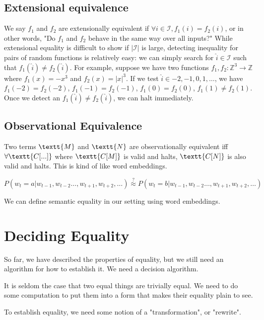 \documentclass[11pt]{article}
\begin{document}
    \subsection{Extensional equivalence}\label{subsec:extensional-equivalence}

    We say $f_1$ and $f_2$ are extensionally equivalent if $\forall i \in \mathcal{I}, f_1(i)=f_2(i)$, or in other words, "Do $f_1$ and $f_2$ behave in the same way over all inputs?" While extensional equality is difficult to show if $|\mathcal{I}|$ is large, detecting inequality for pairs of random functions is relatively easy: we can simply search for $\hat i \in \mathcal{I}$ such that $f_1(\hat i) \neq f_2(\hat i)$. For example, suppose we have two functions $f_1, f_2: \mathbb{Z}^3 \rightarrow \mathbb{Z}$ where $f_1(x)=-x^3$ and $f_2(x)=|x|^3$. If we test $\hat i \in {-2, -1, 0, 1, \ldots}$, we have $f_1(-2)=f_2(-2)$, $f_1(-1)=f_2(-1)$, $f_1(0)=f_2(0)$, $f_1(1) \neq f_2(1)$. Once we detect an $f_1(\hat i) \neq f_2(\hat i)$, we can halt immediately.

    \subsection{Observational Equivalence}

    Two terms $\textt{M}$ and $\textt{N}$ are observationally equivalent iff $\forall \textt{C[...]}$ where $\textt{C[M]}$ is valid and halts, $\textt{C[N]}$ is also valid and halts. This is kind of like word embeddings.

    $P(w_t = a | w_{t-1}, w_{t-2}\ldots, w_{t+1}, w_{t+2}, \ldots)\overset{?}{\approx} P(w_t = b | w_{t-1}, w_{t-2}\ldots, w_{t+1}, w_{t+2}, \ldots)$

    We can define semantic equality in our setting using word embeddings.

    \section{Deciding Equality}\label{sec:structural}



    So far, we have described the properties of equality, but we still need an algorithm for how to establish it. We need a decision algorithm.

    It is seldom the case that two equal things are trivially equal. We need to do some computation to put them into a form that makes their equality plain to see.

    To establish equality, we need some notion of a "transformation", or "rewrite".
\end{document}
